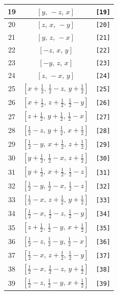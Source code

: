 \documentclass[fleqn,8pt]{jsarticle}
\begin{document}
\begin{longtable}{ccc}
19 & $\left[ y,\, - z,\, x \right]$ & {\tt [19]} \\ \hline
20 & $\left[ z,\, x,\, - y \right]$ & {\tt [20]} \\ \hline
21 & $\left[ y,\, z,\, - x \right]$ & {\tt [21]} \\ \hline
22 & $\left[ - z,\, x,\, y \right]$ & {\tt [22]} \\ \hline
23 & $\left[ - y,\, z,\, x \right]$ & {\tt [23]} \\ \hline
24 & $\left[ z,\, - x,\, y \right]$ & {\tt [24]} \\ \hline
25 & $\left[ x + \frac{1}{2},\, \frac{1}{2} - z,\, y + \frac{1}{2} \right]$ & {\tt [25]} \\ \hline
26 & $\left[ x + \frac{1}{2},\, z + \frac{1}{2},\, \frac{1}{2} - y \right]$ & {\tt [26]} \\ \hline
27 & $\left[ z + \frac{1}{2},\, y + \frac{1}{2},\, \frac{1}{2} - x \right]$ & {\tt [27]} \\ \hline
28 & $\left[ \frac{1}{2} - z,\, y + \frac{1}{2},\, x + \frac{1}{2} \right]$ & {\tt [28]} \\ \hline
29 & $\left[ \frac{1}{2} - y,\, x + \frac{1}{2},\, z + \frac{1}{2} \right]$ & {\tt [29]} \\ \hline
30 & $\left[ y + \frac{1}{2},\, \frac{1}{2} - x,\, z + \frac{1}{2} \right]$ & {\tt [30]} \\ \hline
31 & $\left[ y + \frac{1}{2},\, x + \frac{1}{2},\, \frac{1}{2} - z \right]$ & {\tt [31]} \\ \hline
32 & $\left[ \frac{1}{2} - y,\, \frac{1}{2} - x,\, \frac{1}{2} - z \right]$ & {\tt [32]} \\ \hline
33 & $\left[ \frac{1}{2} - x,\, z + \frac{1}{2},\, y + \frac{1}{2} \right]$ & {\tt [33]} \\ \hline
34 & $\left[ \frac{1}{2} - x,\, \frac{1}{2} - z,\, \frac{1}{2} - y \right]$ & {\tt [34]} \\ \hline
35 & $\left[ z + \frac{1}{2},\, \frac{1}{2} - y,\, x + \frac{1}{2} \right]$ & {\tt [35]} \\ \hline
36 & $\left[ \frac{1}{2} - z,\, \frac{1}{2} - y,\, \frac{1}{2} - x \right]$ & {\tt [36]} \\ \hline
37 & $\left[ \frac{1}{2} - x,\, z + \frac{1}{2},\, \frac{1}{2} - y \right]$ & {\tt [37]} \\ \hline
38 & $\left[ \frac{1}{2} - x,\, \frac{1}{2} - z,\, y + \frac{1}{2} \right]$ & {\tt [38]} \\ \hline
39 & $\left[ \frac{1}{2} - z,\, \frac{1}{2} - y,\, x + \frac{1}{2} \right]$ & {\tt [39]} \\ \hline

\end{longtable}
\end{document}
